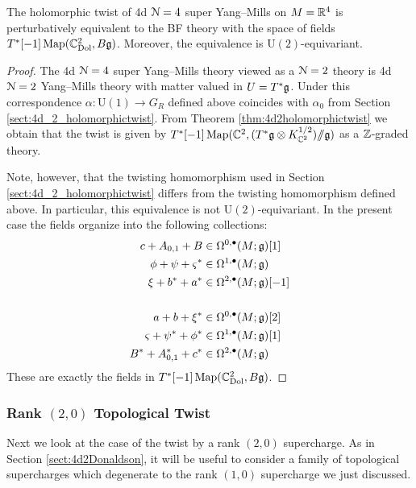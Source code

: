 \documentclass[10pt, oneside]{article}
\renewcommand{\U}{\mathrm{U}}
\newcommand{\ham}{/\!\!/}
\begin{document}
\begin{theorem}
The holomorphic twist of 4d $\mathcal N=4$ super Yang--Mills on $M=\mathbb R^4$ is perturbatively equivalent to the BF theory with the space of fields $T^*[-1] \operatorname{Map}(\mathbb C^2_{\rm Dol} , B \mathfrak g)$. Moreover, the equivalence is $\U(2)$-equivariant.
\label{thm:4d4holomorphictwist}
\end{theorem}
\begin{proof}
The 4d $\mathcal N=4$ super Yang--Mills theory viewed as a $\mathcal N=2$ theory is 4d $\mathcal N=2$ Yang--Mills theory with matter valued in $U=T^*\mathfrak g$. Under this correspondence $\alpha\colon \U(1)\rightarrow G_R$ defined above coincides with $\alpha_0$ from Section \ref{sect:4d_2_holomorphictwist}. From Theorem \ref{thm:4d2holomorphictwist} we obtain that the twist is given by $T^*[-1] \map(\CC^2 , (T^*\fg\otimes K_{\CC^2}^{1/2})\ham \fg)$ as a $\mathbb Z$-graded theory.

Note, however, that the twisting homomorphism used in Section \ref{sect:4d_2_holomorphictwist} differs from the twisting homomorphism defined above. In particular, this equivalence is not $\U(2)$-equivariant. In the present case the fields organize into the following collections:
\begin{align*}
c+A_{0, 1}+B&\in\Omega^{0, \bullet}(M; \mathfrak g)[1] \\
\phi + \psi + \varsigma^*&\in\Omega^{1, \bullet}(M; \mathfrak g) \\
\xi + b^* + a^*&\in\Omega^{2, \bullet}(M; \mathfrak g)[-1] \\
\\
a + b + \xi^*&\in\Omega^{0, \bullet}(M; \mathfrak g)[2] \\
\varsigma + \psi^* + \phi^* &\in\Omega^{1, \bullet}(M; \mathfrak g)[1] \\
B^*+A^*_{0, 1}+ c^*&\in\Omega^{2, \bullet}(M; \mathfrak g)
\end{align*}
These are exactly the fields in $T^*[-1] \operatorname{Map}(\mathbb C^2_{\rm Dol} , B \mathfrak g)$.
\end{proof}

\subsubsection{Rank \texorpdfstring{$(2,0)$}{(2,0)} Topological Twist}
\label{sect:4d4Atwist}

Next we look at the case of the twist by a rank $(2,0)$ supercharge. 
As in Section \ref{sect:4d2Donaldson}, it will be useful to consider a family of topological supercharges which degenerate to the rank $(1,0)$ supercharge we just discussed. 
\end{document}
